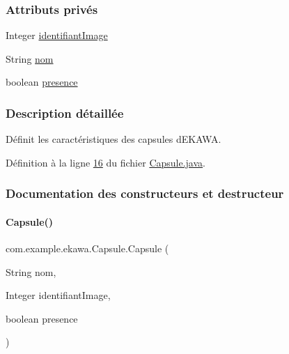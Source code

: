 \subsubsection*{Attributs privés}
\begin{DoxyCompactItemize}
\item 
Integer \hyperlink{classcom_1_1example_1_1ekawa_1_1_capsule_a05fa50e416ea3a48d6b8dab73174c9d0}{identifiant\+Image}
\item 
String \hyperlink{classcom_1_1example_1_1ekawa_1_1_capsule_a936a082e9bcfdda4bb8fbffd33665cb0}{nom}
\item 
boolean \hyperlink{classcom_1_1example_1_1ekawa_1_1_capsule_a351ef1f4b4258f4651d24b206fc38a94}{presence}
\end{DoxyCompactItemize}


\subsubsection{Description détaillée}
Définit les caractéristiques des capsules d\textquotesingle{}E\+K\+A\+WA. 

Définition à la ligne \hyperlink{_capsule_8java_source_l00016}{16} du fichier \hyperlink{_capsule_8java_source}{Capsule.\+java}.



\subsubsection{Documentation des constructeurs et destructeur}
\mbox{\label{classcom_1_1example_1_1ekawa_1_1_capsule_a7d802ab4d4c4732063c997d1be472186}} 
\paragraph{\texorpdfstring{Capsule()}{Capsule()}}
{\footnotesize\ttfamily com.\+example.\+ekawa.\+Capsule.\+Capsule (\begin{DoxyParamCaption}\item[{String}]{nom,  }\item[{Integer}]{identifiant\+Image,  }\item[{boolean}]{presence }\end{DoxyParamCaption})}



